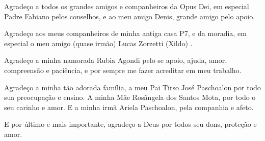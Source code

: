 {Agradeço a todos os grandes amigos e companheiros da Opus Dei, em especial Padre Fabiano pelos conselhos, e ao meu amigo Denis, grande amigo pelo apoio.


Agradeço aos meus companheiros de minha antiga casa P7, e da moradia, em especial o meu amigo (quase irmão) Lucas Zorzetti (Xildo) . 


Agradeço a minha namorada Rubia Agondi pelo se apoio, ajuda, amor, compreensão e paciência, e por sempre me fazer acreditar em meu trabalho.


Agradeço a minha tão adorada família, a meu Pai Tirso José Paschoalon por todo sua preocupação e ensino. A minha Mãe Rosângela dos Santos Mota, por todo o seu carinho e amor. E a minha irmã Ariela Paschoalon, pela companhia e afeto.


 E por último e mais importante, agradeço a Deus por todos seu dons, proteção e amor. 


}
